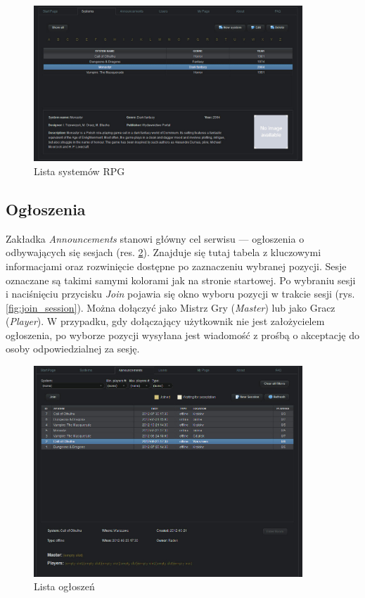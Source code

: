 \begin{figure}[htb]	
\centering
\includegraphics[width=0.9\textwidth]{./img/interfejsy/systems}
\caption{Lista systemów RPG}
\label{fig:systems}
\end{figure}

\subsection{Ogłoszenia}
\label{sec:sessions}
Zakładka \emph{Announcements} stanowi główny cel serwisu --- ogłoszenia o odbywających się sesjach (res. \ref{fig:sessions}).  Znajduje się tutaj tabela z kluczowymi informacjami oraz rozwinięcie dostępne po zaznaczeniu wybranej pozycji. Sesje oznaczane są takimi samymi kolorami jak na stronie startowej. Po wybraniu sesji i naciśnięciu przycisku \emph{Join} pojawia się okno wyboru pozycji w trakcie sesji (rys. \ref{fig:join_session}). Można dołączyć jako Mistrz Gry (\emph{Master}) lub jako Gracz (\emph{Player}). W przypadku, gdy dołączający użytkownik nie jest założycielem ogłoszenia, po wyborze pozycji wysyłana jest wiadomość z prośbą o akceptację do osoby odpowiedzialnej za sesję. 

\begin{figure}[htb]	
\centering
\includegraphics[width=0.9\textwidth]{./img/interfejsy/sessions}
\caption{Lista ogłoszeń}
\label{fig:sessions}
\end{figure}

